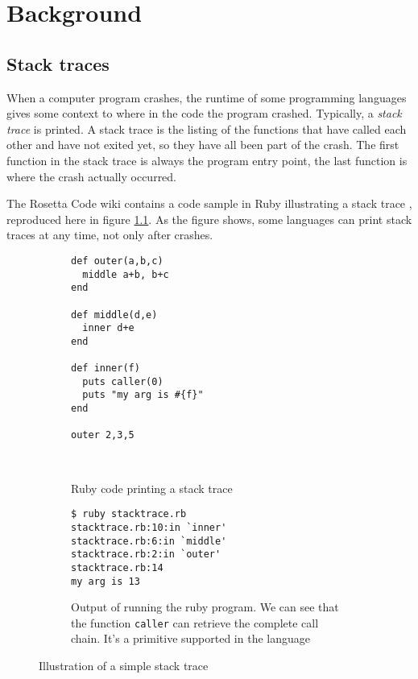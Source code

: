 \chapter{Background}


\section{Stack traces}

When a computer program crashes, the runtime of some programming languages
gives some context to where in the code the program crashed.
Typically, a \emph{stack trace} is printed. A stack trace is the listing
of the functions that have called each other and have not exited yet, so
they have all been part of the crash. The first function in the stack
trace is always the program entry point, the last function is where the
crash actually occurred.

The Rosetta Code wiki contains a code sample in Ruby illustrating a stack
trace \cite{rosetta_stone_st}, reproduced here in figure
\ref{fig:ruby_stack_trace}. As the figure shows, some languages can print stack
traces at any time, not only after crashes.

\begin{figure}
  \begin{subfigure}[t]{0.5\textwidth}
      \begin{verbatim}
def outer(a,b,c)
  middle a+b, b+c
end

def middle(d,e)
  inner d+e
end

def inner(f)
  puts caller(0)
  puts "my arg is #{f}"
end

outer 2,3,5
       \end{verbatim}
    \caption{Ruby code printing a stack trace}
    ~ %
  \end{subfigure}
        \begin{subfigure}[t]{0.5\textwidth}
          \begin{verbatim}
$ ruby stacktrace.rb
stacktrace.rb:10:in `inner'
stacktrace.rb:6:in `middle'
stacktrace.rb:2:in `outer'
stacktrace.rb:14
my arg is 13
          \end{verbatim}
          \caption{Output of running the ruby program. We can see that the
            function \texttt{caller} can retrieve the complete call chain. It's
            a primitive supported in the language}
        \end{subfigure}
        \caption{Illustration of a simple stack trace
        }\label{fig:ruby_stack_trace}
\end{figure}

